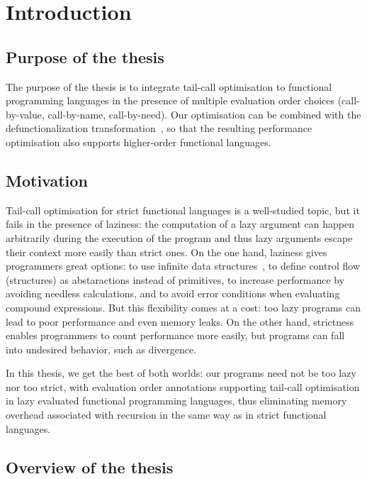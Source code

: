\documentclass[diploma]{softlab-thesis}
\begin{document}
\englishtext

\chapter{Introduction}
\label{ch:introduction}

\section {Purpose of the thesis}

The purpose of the thesis is to integrate tail-call optimisation to functional programming languages 
in the presence of multiple evaluation order choices (call-by-value, call-by-name, call-by-need). Our optimisation can be combined with the 
defunctionalization transformation~\cite{Reynolds72definitionalinterpreters}, so that the resulting performance optimisation also supports
higher-order functional languages. 

\section {Motivation}

Tail-call optimisation for strict functional languages is a well-studied topic, but it fails in the 
presence of laziness: the computation of a lazy argument can happen arbitrarily during the execution 
of the program and thus lazy arguments escape their context more easily than strict ones.
On the one hand, laziness gives programmers great options: to use infinite data structures~\cite{Abel13}, 
to define control flow (structures) as abstaractions instead of primitives, to increase performance
by avoiding needless calculations, and to avoid error conditions when evaluating compound expressions.
But this flexibility comes at a cost: too lazy programs can lead to poor performance and even memory leaks.
On the other hand, strictness enables programmers to count performance more easily, but programs can 
fall into undesired behavior, such as divergence.

In this thesis, we get the best of both worlds: our programs need not be too lazy nor too strict,
with evaluation order annotations supporting tail-call optimisation in lazy evaluated 
functional programming languages, thus eliminating memory overhead associated with recursion in the 
same way as in strict functional languages.

\section {Overview of the thesis}
\end{document}
